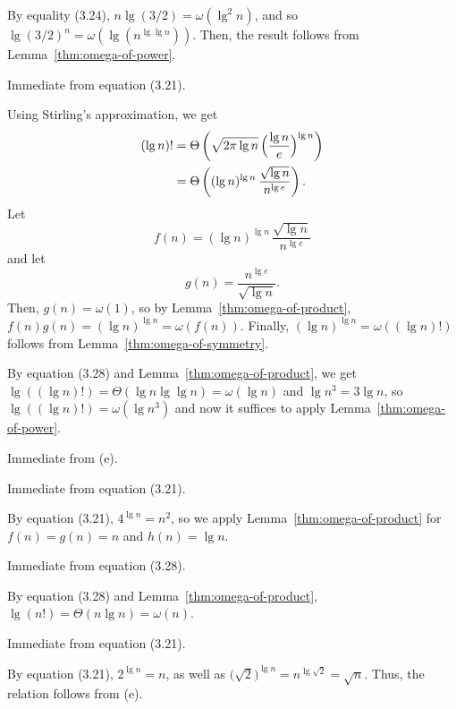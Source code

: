 \begin{description}[style=nextline]
    By equality (3.24), $n\lg(3/2)=\omega(\lg^2n)$, and so $\lg(3/2)^n=\omega(\lg(n^{\lg\lg n}))$.
    Then, the result follows from Lemma~\ref{thm:omega-of-power}.
    \item[$n^{\lg\lg n}=\Theta((\lg n)^{\lg n})$]
    Immediate from equation (3.21).
    \item[$(\lg n)^{\lg n}=\omega((\lg n)!)$]
    Using Stirling's approximation, we get
    \begin{align*}
        (\lg n)! &= \Theta\left(\sqrt{2\pi\lg n}\,\Bigl(\frac{\lg n}{e}\Bigr)^{\lg n}\right) \\
        &= \Theta\left((\lg n)^{\lg n}\,\frac{\sqrt{\lg n}}{n^{\lg e}}\right).
    \end{align*}
    Let
    \[
        f(n) = (\lg n)^{\lg n}\,\frac{\sqrt{\lg n}}{n^{\lg e}}
    \]
    and let
    \[
        g(n) = \frac{n^{\lg e}}{\sqrt{\lg n}}.
    \]
    Then, $g(n)=\omega(1)$, so by Lemma~\ref{thm:omega-of-product}, $f(n)g(n)=(\lg n)^{\lg n}=\omega(f(n))$.
    Finally, $(\lg n)^{\lg n}=\omega((\lg n)!)$ follows from Lemma~\ref{thm:omega-of-symmetry}.
    \item[$(\lg n)!=\omega(n^3)$]
    By equation (3.28) and Lemma~\ref{thm:omega-of-product}, we get $\lg((\lg n)!)=\Theta(\lg n\lg\lg n)=\omega(\lg n)$ and $\lg n^3=3\lg n$, so $\lg((\lg n)!)=\omega(\lg n^3)$ and now it suffices to apply Lemma~\ref{thm:omega-of-power}.
    \item[$n^3=\omega(n^2)$]
    Immediate from (e).
    \item[$n^2=\Theta(4^{\lg n})$]
    Immediate from equation (3.21).
    \item[$4^{\lg n}=\omega(n\lg n)$]
    By equation (3.21), $4^{\lg n}=n^2$, so we apply Lemma~\ref{thm:omega-of-product} for $f(n)=g(n)=n$ and $h(n)=\lg n$.
    \item[$n\lg n=\Theta(\lg(n!))$]
    Immediate from equation (3.28).
    \item[$\lg(n!)=\omega(n)$]
    By equation (3.28) and Lemma~\ref{thm:omega-of-product}, $\lg(n!)=\Theta(n\lg n)=\omega(n)$.
    \item[$n=\Theta(2^{\lg n})$]
    Immediate from equation (3.21).
    \item[$2^{\lg n}=\omega\bigl(\bigl(\sqrt{2}\bigr)^{\lg n}\bigr)$]
    By equation (3.21), $2^{\lg n}=n$, as well as $\bigl(\sqrt{2}\bigr)^{\lg n}=n^{\lg\sqrt{2}}=\sqrt{n}$.
    Thus, the relation follows from (e).
    \item[$\bigl(\sqrt{2}\bigr)^{\lg n}=\omega\bigl(2^{\sqrt{2\lg n}}\bigr)$]

\end{description}
